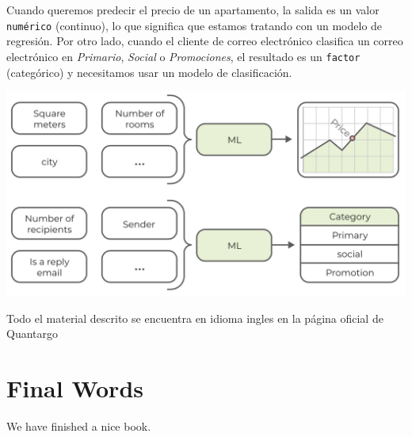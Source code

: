 \documentclass[
]{book}
\begin{document}
Cuando queremos predecir el precio de un apartamento, la salida es un valor \texttt{numérico} (continuo), lo que significa que estamos tratando con un modelo de regresión. Por otro lado, cuando el cliente de correo electrónico clasifica un correo electrónico en \emph{Primario}, \emph{Social} o \emph{Promociones}, el resultado es un \texttt{factor} (categórico) y necesitamos usar un modelo de clasificación.

\includegraphics{img/RCE.png}

Todo el material descrito se encuentra en idioma ingles en la página oficial de Quantargo \citep{quantargo2}

\hypertarget{final-words}{%
\chapter{Final Words}\label{final-words}}

We have finished a nice book.

  
\end{document}
